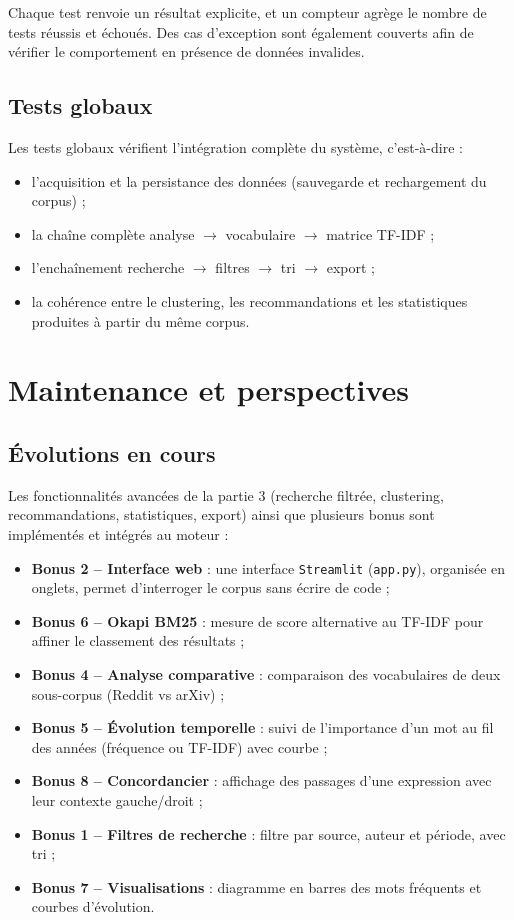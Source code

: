 \documentclass[12pt,a4paper]{article}
\begin{document}
Chaque test renvoie un résultat explicite, et un compteur agrège le nombre de tests réussis et échoués. Des cas d'exception sont également couverts afin de vérifier le comportement en présence de données invalides.

\subsection{Tests globaux}

Les tests globaux vérifient l'intégration complète du système, c'est-à-dire :

\begin{itemize}
    \item l'acquisition et la persistance des données (sauvegarde et rechargement du corpus) ;
    \item la chaîne complète analyse $\rightarrow$ vocabulaire $\rightarrow$ matrice TF-IDF ;
    \item l'enchaînement recherche $\rightarrow$ filtres $\rightarrow$ tri $\rightarrow$ export ;
    \item la cohérence entre le clustering, les recommandations et les statistiques produites à partir du même corpus.
\end{itemize}

\section{Maintenance et perspectives}

\subsection{Évolutions en cours}

Les fonctionnalités avancées de la partie 3 (recherche filtrée, clustering, recommandations, statistiques, export) ainsi que plusieurs bonus sont implémentés et intégrés au moteur :
\begin{itemize}
    \item \textbf{Bonus 2 -- Interface web} : une interface \texttt{Streamlit} (\texttt{app.py}), organisée en onglets, permet d'interroger le corpus sans écrire de code ;
    \item \textbf{Bonus 6 -- Okapi BM25} : mesure de score alternative au TF-IDF pour affiner le classement des résultats ;
    \item \textbf{Bonus 4 -- Analyse comparative} : comparaison des vocabulaires de deux sous-corpus (Reddit vs arXiv) ;
    \item \textbf{Bonus 5 -- Évolution temporelle} : suivi de l'importance d'un mot au fil des années (fréquence ou TF-IDF) avec courbe ;
    \item \textbf{Bonus 8 -- Concordancier} : affichage des passages d'une expression avec leur contexte gauche/droit ;
    \item \textbf{Bonus 1 -- Filtres de recherche} : filtre par source, auteur et période, avec tri ;
    \item \textbf{Bonus 7 -- Visualisations} : diagramme en barres des mots fréquents et courbes d'évolution.
\end{itemize}
\end{document}
